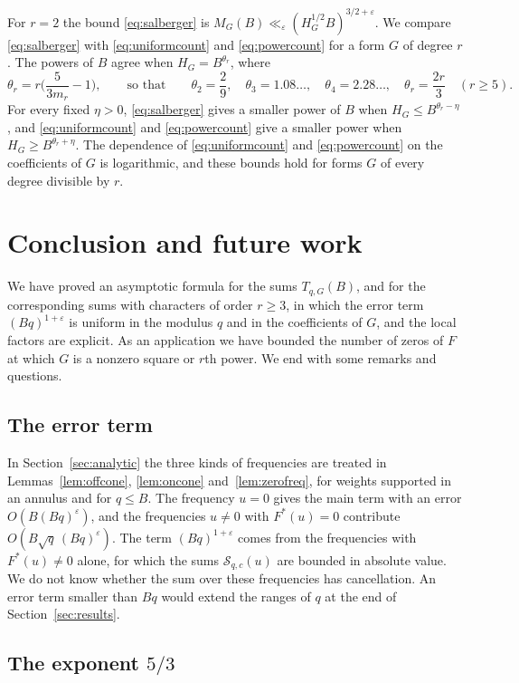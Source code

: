 \documentclass[11pt]{amsart}
\numberwithin{equation}{section}
\numberwithin{figure}{section}
\theoremstyle{definition}
\newcommand{\eps}{\varepsilon}
\begin{document}
For $r=2$ the bound \eqref{eq:salberger} is
$M_G(B)\ll_\eps(H_G^{1/2}B)^{3/2+\eps}$. We compare
\eqref{eq:salberger} with \eqref{eq:uniformcount} and
\eqref{eq:powercount} for a form $G$ of degree $r$. The powers of
$B$ agree when $H_G=B^{\theta_r}$, where
\[
 \theta_r=r\Big(\frac5{3m_r}-1\Big),\qquad\text{so that}\qquad
 \theta_2=\frac29,\quad\theta_3=1.08\ldots,\quad\theta_4=2.28\ldots,
 \quad\theta_r=\frac{2r}3\quad(r\ge5).
\]
For every fixed $\eta>0$, \eqref{eq:salberger} gives a smaller power
of $B$ when $H_G\le B^{\theta_r-\eta}$, and \eqref{eq:uniformcount}
and \eqref{eq:powercount} give a smaller power when
$H_G\ge B^{\theta_r+\eta}$. The dependence of
\eqref{eq:uniformcount} and \eqref{eq:powercount} on the
coefficients of $G$ is logarithmic, and these bounds hold for forms
$G$ of every degree divisible by $r$.

\section{Conclusion and future work}\label{sec:conclusion}

We have proved an asymptotic formula for the sums $T_{q,G}(B)$, and
for the corresponding sums with characters of order $r\ge3$, in which
the error term $(Bq)^{1+\eps}$ is uniform in the modulus $q$ and in
the coefficients of $G$, and the local factors are explicit. As an
application we have bounded the number of zeros of $F$ at which $G$
is a nonzero square or $r$th power. We end with some remarks and
questions.

\subsection{The error term}\label{sec:conclusion-error}

In Section~\ref{sec:analytic} the three kinds of frequencies are
treated in Lemmas~\ref{lem:offcone}, \ref{lem:oncone}
and~\ref{lem:zerofreq}, for weights supported in an annulus and for
$q\le B$. The frequency $u=0$ gives the
main term with an error $O(B(Bq)^\eps)$, and the frequencies $u\ne0$
with $F^*(u)=0$ contribute $O(B\sqrt q\,(Bq)^\eps)$. The term
$(Bq)^{1+\eps}$ comes from the frequencies with $F^*(u)\ne0$ alone,
for which the sums $\mathcal S_{q,c}(u)$ are bounded in absolute
value. We do not know whether the sum over these frequencies has
cancellation. An error term smaller than $Bq$ would extend the ranges
of $q$ at the end of Section~\ref{sec:results}.

\subsection{The exponent \texorpdfstring{$5/3$}{5/3}}\label{sec:conclusion-exponent}
\end{document}
